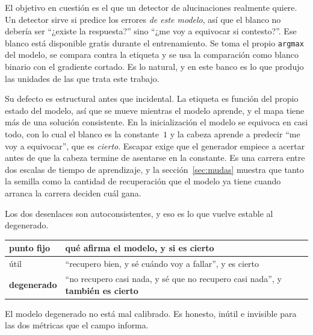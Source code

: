 \documentclass[11pt,a4paper]{article}
\begin{document}
El objetivo en cuestión es el que un detector de alucinaciones realmente quiere. Un detector sirve si
predice los errores \emph{de este modelo}, así que el blanco no debería ser ``¿existe la respuesta?''
sino ``¿me voy a equivocar si contesto?''. Ese blanco está disponible gratis durante el entrenamiento.
Se toma el propio \texttt{argmax} del modelo, se compara contra la etiqueta y se usa la comparación
como blanco binario con el gradiente cortado. Es lo natural, y en este banco es lo que produjo las
unidades de las que trata este trabajo.

Su defecto es estructural antes que incidental. La etiqueta es función del propio estado del modelo,
así que se mueve mientras el modelo aprende, y el mapa tiene más de una solución consistente. En la
inicialización el modelo se equivoca en casi todo, con lo cual el blanco es la constante~$1$ y la
cabeza aprende a predecir ``me voy a equivocar'', que es \emph{cierto}. Escapar exige que el generador
empiece a acertar antes de que la cabeza termine de asentarse en la constante. Es una carrera entre dos
escalas de tiempo de aprendizaje, y la sección~\ref{sec:mudas} muestra que tanto la semilla como la
cantidad de recuperación que el modelo ya tiene cuando arranca la carrera deciden cuál gana.

Los dos desenlaces son autoconsistentes, y eso es lo que vuelve estable al degenerado.

\begin{center}
\begin{tabular}{ll}
\toprule
punto fijo & qué afirma el modelo, y si es cierto \\
\midrule
útil & ``recupero bien, y sé cuándo voy a fallar'', y es cierto \\
\textbf{degenerado} & ``no recupero casi nada, y sé que no recupero casi nada'', y \textbf{también es cierto} \\
\bottomrule
\end{tabular}
\end{center}

El modelo degenerado no está mal calibrado. Es honesto, inútil e invisible para las dos métricas que
el campo informa.
\end{document}
